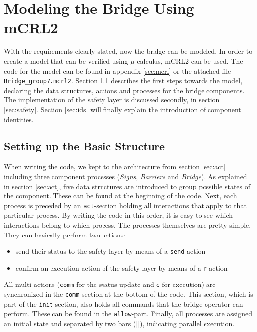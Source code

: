 \section{Modeling the Bridge Using mCRL2}
\label{sec:model}

With the requirements clearly stated, now the bridge can be modeled. In order to create a model that can be verified using $\mu$-calculus, mCRL2 can be used. The code for the model can be found in appendix \ref{sec:mcrl} or the attached file \texttt{Bridge\_group7.mcrl2}. Section \ref{sec:basic} describes the first steps towards the model, declaring the data structures, actions and processes for the bridge components. The implementation of the safety layer is discussed secondly, in section \ref{sec:safety}. Section \ref{sec:ids} will finally explain the introduction of component identities.

\subsection{Setting up the Basic Structure}
\label{sec:basic}
When writing the code, we kept to the architecture from section \ref{sec:act} including three component processes (\emph{Signs}, \emph{Barriers} and \emph{Bridge}). As explained in section \ref{sec:act}, five data structures are introduced to group possible states of the component. These can be found at the beginning of the code. Next, each process is preceded by an \texttt{act}-section holding all interactions that apply to that particular process. By writing the code in this order, it is easy to see which interactions belong to which process. The processes themselves are pretty simple. They can basically perform two actions:
%
\begin{itemize}
	\item send their status to the safety layer by means of a \texttt{send} action
	\item confirm an execution action of the safety layer by means of a \texttt{r}-action
\end{itemize}
%
All multi-actions (\texttt{comm} for the status update and \texttt{c} for execution) are synchronized in the \texttt{comm}-section at the bottom of the code. This section, which is part of the \texttt{init}-section, also holds all commands that the bridge operator can perform. These can be found in the \texttt{allow}-part. Finally, all processes are assigned an initial state and separated by two bars ($||$), indicating parallel execution.


